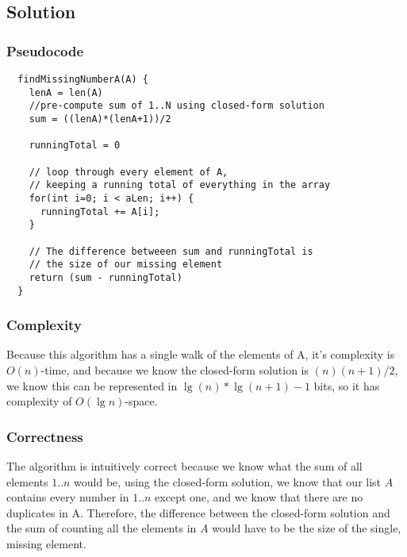\subsection*{Solution}
\subsubsection*{Pseudocode}
\begin{verbatim}
  findMissingNumberA(A) {
    lenA = len(A)
    //pre-compute sum of 1..N using closed-form solution
    sum = ((lenA)*(lenA+1))/2

    runningTotal = 0

    // loop through every element of A, 
    // keeping a running total of everything in the array
    for(int i=0; i < aLen; i++) {
      runningTotal += A[i];
    }

    // The difference betweeen sum and runningTotal is
    // the size of our missing element
    return (sum - runningTotal)
  }
\end{verbatim}

\subsubsection*{Complexity}
Because this algorithm has a single walk of the elements of A, it's complexity is $O(n)$-time, and because we know the closed-form solution is $(n)(n+1)/2$, we know this can be represented in $\lg(n)*\lg(n+1)-1$ bits, so it has complexity of $O(\lg n)$-space.

\subsubsection*{Correctness}
The algorithm is intuitively correct because we know what the sum of all elements $1..n$ would be, using the closed-form solution, we know that our list $A$ contains every number in $1..n$ except one, and we know that there are no duplicates in A. Therefore, the difference between the closed-form solution and the sum of counting all the elements in $A$ would have to be the size of the single, missing element.
